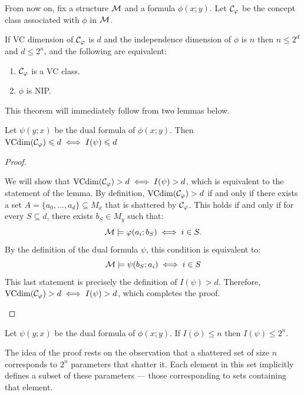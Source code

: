 From now on, fix a structure $\mathcal{M}$ and a formula $\phi(x;y)$. Let $\mathcal{C}_\varphi$ be the concept class associated with $\phi$ in $\mathcal{M}$.

\begin{theorem}
    \label{thm:NIPfiniteVC}
    If VC dimension of $\mathcal{C}_\varphi$ is $d$ and the independence dimension of $\phi$ is $n$ then $n\leq 2^d$ and $d \leq 2^n$, and the following are equivalent:
    \begin{enumerate}
        \item $\mathcal{C}_\varphi$ is a VC class.
        \item $\phi$ is NIP.
    \end{enumerate}
\end{theorem}

This theorem will immediately follow from two lemmas below.

\begin{lemma}
    \label{lem:14}
    Let $\psi(y;x)$ be the dual formula of $\phi(x;y)$. Then $\operatorname{VCdim}(\mathcal{C}_\varphi)\leqslant d \iff I(\psi)\leqslant d$
\end{lemma}

\begin{proof}
\begin{outline}
\0 We will show that $\operatorname{VCdim}(\mathcal{C}_\varphi) > d \iff I(\psi) > d$, which is equivalent to the statement of the lemma.
    \1 By definition, $\operatorname{VCdim}(\mathcal{C}_\varphi) > d$ if and only if there exists a set $A = \{a_0, \ldots, a_d\} \subseteq M_x$ that is shattered by $\mathcal{C}_\varphi$. This holds if and only if for every $S \subseteq d$, there exists $b_S \in M_y$ such that:
    $$\mathcal{M}\models\varphi(a_i;b_S) \iff i\in S.$$ 
    \1 By the definition of the dual formula $\psi$, this condition is equivalent to:
    $$\mathcal{M} \models \psi(b_S;a_i) \iff i\in S$$
\0 This last statement is precisely the definition of $I(\psi) > d$. Therefore, $\operatorname{VCdim}(\mathcal{C}_\varphi) > d \iff I(\psi) > d$, which completes the proof.
\end{outline}
\end{proof}

\begin{lemma}
    \label{lem:15}
    Let $\psi(y;x)$ be the dual formula of $\phi(x;y)$. If $I(\phi)\leq n$ then $I(\psi)\leq 2^n$.
\end{lemma}

The idea of the proof rests on the observation that a shattered set of size $n$ corresponds to $2^n$ parameters that shatter it. Each element in this set implicitly defines a subset of these parameters --- those corresponding to sets containing that element. 

